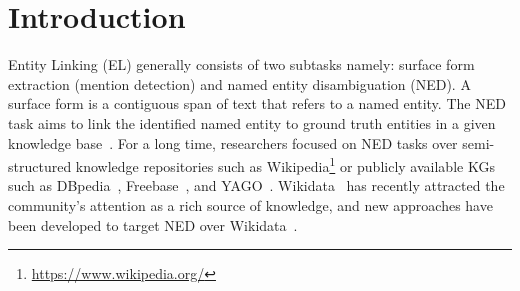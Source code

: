\documentclass[sigconf, superscriptaddress]{acmart}
\begin{document}
\maketitle

\section{Introduction}

Entity Linking (EL) generally consists of two subtasks namely: surface form extraction (mention detection) and named entity disambiguation (NED). A surface form is a contiguous span of text that refers to a named entity. The NED task aims to link the identified named entity to ground truth entities in a given knowledge base~\cite{kuldeep-frankenstein-why-reinvent}. 
For a long time, researchers focused on NED tasks over semi-structured knowledge repositories such as Wikipedia\footnote{\url{https://www.wikipedia.org/}} or publicly available KGs such as DBpedia~\cite{dbpedia-swj}, Freebase~\cite{DBLP:conf/aaai/BollackerCT07}, and YAGO~\cite{yago}. Wikidata~\cite{DBLP:conf/www/Vrandecic12} has recently attracted the community's attention as a rich source of knowledge, and new approaches have been developed to target NED over Wikidata~\cite{cetoli2019neural}. 
\end{document}

